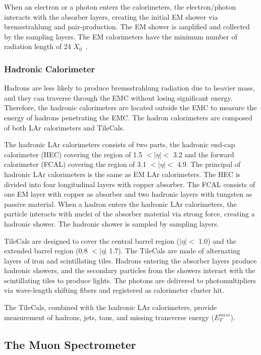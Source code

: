When an electron or a photon enters the calorimeters, the electron/photon interacts with the absorber layers, creating the initial EM shower via bremsstrahlung and pair-production. The EM shower is amplified and collected by the sampling layers. The EM calorimeters have the minimum number of radiation length of 24 $X_{0}$~\cite{ATLAS-LAR-CALORIMETER}.




\subsubsection{Hadronic Calorimeter}
\label{sec:atlas:Hcal}
Hadrons are less likely to produce bremsstrahlung radiation due to heavier mass, and they can traverse through the EMC without losing significant energy. Therefore, the hadronic calorimeters are located outside the EMC to measure the energy of hadrons penetrating the EMC. The hadron calorimeters are composed of both LAr calorimeters and TileCals.

The hadronic LAr calorimeters consists of two parts, the hadronic end-cap calorimeter (HEC) covering the region of 1.5 $<|\eta|<$ 3.2 and the forward calorimeter (FCAL) covering the region of 3.1 $<|\eta|<$ 4.9. The principal of hadronic LAr calorimeters is the same as EM LAr calorimeters. The HEC is divided into four longitudinal layers with copper absorber. The FCAL consists of one EM layer with copper as absorber and two hadronic layers with tungsten as passive material. When a hadron enters the hadronic LAr calorimeters, the particle interacts with nuclei of the absorber material via strong force, creating a hadronic shower. The hadronic shower is sampled by sampling layers.

 TileCals are designed to cover the central barrel region ($|\eta| <$ 1.0) and the extended barrel region (0.8 $<|\eta|$ 1.7). The TileCals are made of alternating layers of iron and scintillating tiles. Hadrons entering the absorber layers produce hadronic showers, and the secondary particles from the showers interact with the scintillating tiles to produce lights. The photons are delivered to photomultipliers via wave-length shifting fibers and registered as calorimeter cluster hit.

The TileCals, combined with the hadronic LAr calorimeters, provide measurement of hadrons, jets, taus, and missing transverse energy ($E_{T}^{miss}$).


\subsection{The Muon Spectrometer}
\label{sec:atlas:ms}


